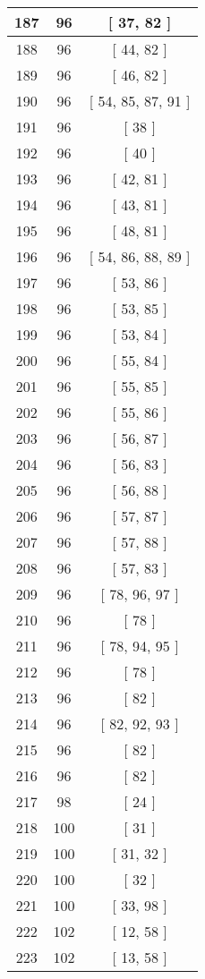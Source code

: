 \begin{center}
\begin{longtable}[H]{|| c c c ||}
187 & 96 & [ 37, 82 ]
\\\hline
188 & 96 & [ 44, 82 ]
\\\hline
189 & 96 & [ 46, 82 ]
\\\hline
190 & 96 & [ 54, 85, 87, 91 ]
\\\hline
191 & 96 & [ 38 ]
\\\hline
192 & 96 & [ 40 ]
\\\hline
193 & 96 & [ 42, 81 ]
\\\hline
194 & 96 & [ 43, 81 ]
\\\hline
195 & 96 & [ 48, 81 ]
\\\hline
196 & 96 & [ 54, 86, 88, 89 ]
\\\hline
197 & 96 & [ 53, 86 ]
\\\hline
198 & 96 & [ 53, 85 ]
\\\hline
199 & 96 & [ 53, 84 ]
\\\hline
200 & 96 & [ 55, 84 ]
\\\hline
201 & 96 & [ 55, 85 ]
\\\hline
202 & 96 & [ 55, 86 ]
\\\hline
203 & 96 & [ 56, 87 ]
\\\hline
204 & 96 & [ 56, 83 ]
\\\hline
205 & 96 & [ 56, 88 ]
\\\hline
206 & 96 & [ 57, 87 ]
\\\hline
207 & 96 & [ 57, 88 ]
\\\hline
208 & 96 & [ 57, 83 ]
\\\hline
209 & 96 & [ 78, 96, 97 ]
\\\hline
210 & 96 & [ 78 ]
\\\hline
211 & 96 & [ 78, 94, 95 ]
\\\hline
212 & 96 & [ 78 ]
\\\hline
213 & 96 & [ 82 ]
\\\hline
214 & 96 & [ 82, 92, 93 ]
\\\hline
215 & 96 & [ 82 ]
\\\hline
216 & 96 & [ 82 ]
\\\hline
217 & 98 & [ 24 ]
\\\hline
218 & 100 & [ 31 ]
\\\hline
219 & 100 & [ 31, 32 ]
\\\hline
220 & 100 & [ 32 ]
\\\hline
221 & 100 & [ 33, 98 ]
\\\hline
222 & 102 & [ 12, 58 ]
\\\hline
223 & 102 & [ 13, 58 ]
\\\hline

\end{longtable}
\end{center}
